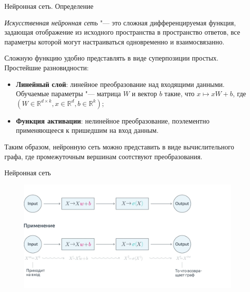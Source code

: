 \documentclass[notheorems, handout, 10pt]{beamer}
\begin{document}
	\begin{frame}{Нейронная сеть. Определение}
		
		\textsl{Искусственная нейронная сеть} "--- это сложная дифференцируемая функция, задающая отображение из исходного пространства в пространство ответов, все параметры которой могут настраиваться одновременно и взаимосвязанно.
		
		\vspace{0.2cm}
		
		Сложную функцию удобно представлять в виде суперпозиции простых. Простейшие разновидности:
		\begin{itemize}
			\item \textbf{Линейный слой}: линейное преобразование над входящими данными. Обучаемые параметры "--- матрица $W$ и вектор $b$ такие, что $x \mapsto xW + b$, где $(W \in \mathbb{R}^{d\times k}, x \in \mathbb{R}^{d}, b \in \mathbb{R}^{k})$;
			\item \textbf{Функция активации}: нелинейное преобразование, поэлементно применяющееся к пришедшим на вход данным.
		\end{itemize}
		
		Таким образом, нейронную сеть можно представить в виде вычислительного графа, где промежуточным вершинам соотствуют преобразования.
		
		\note{
			
		}
	
	\end{frame}
	
	\begin{frame}{Нейронная сеть}
		
		\begin{figure}[H]
			\includegraphics[width=1\linewidth]{images/1}
		\end{figure}
		
		\note{
			
		}
		
	\end{frame}
	
\end{document}
